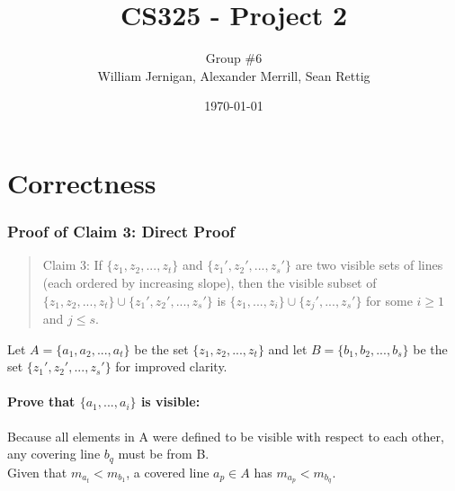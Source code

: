 \documentclass{article}
\title{CS325 - Project 2}
\author{Group \#6 \\ William Jernigan, Alexander Merrill, Sean Rettig}
\date{\today}
\begin{document}
\maketitle

\part*{Correctness}
\section*{Proof of Claim 3: Direct Proof}

\begin{quote}
Claim 3: If $\{z_{1},z_{2},...,z_{t}\}$ and $\{z_{1}',z_{2}',...,z_{s}'\}$ are two visible sets of lines (each ordered by increasing slope), then the visible subset of $\{z_{1},z_{2},...,z_{t}\}\cup\{z_{1}',z_{2}',...,z_{s}'\}$ is $\{z_{1},...,z_{i}\}\cup\{z_{j}',...,z_{s}'\}$ for some $i \geq 1$ and $j \leq s$.
\end{quote}
Let $A = \{a_{1},a_{2},...,a_{t}\}$ be the set $\{z_{1},z_{2},...,z_{t}\}$ and let $B = \{b_{1},b_{2},...,b_{s}\}$ be the set $\{z_{1}',z_{2}',...,z_{s}'\}$ for improved clarity.

\subsection*{Prove that $\{a_{1},...,a_{i}\}$ is visible:}
    Because all elements in A were defined to be visible with respect to each other, any covering line $b_{q}$ must be from B.\\
    Given that $m_{a_{t}} < m_{b_{1}}$, a covered line $a_{p} \in A$ has $m_{a_{p}} < m_{b_{q}}$.
    
\end{document}
